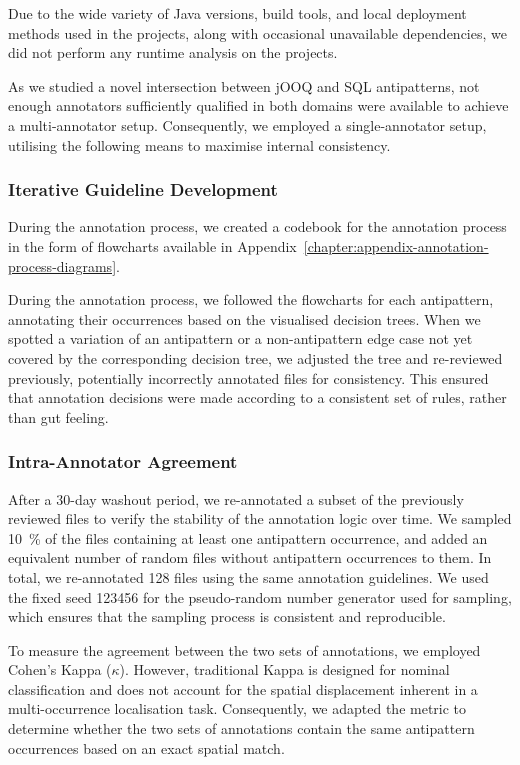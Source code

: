 Due to the wide variety of Java versions, build tools, and local deployment methods used in the projects, along with occasional unavailable dependencies, we did not perform any runtime analysis on the projects.

As we studied a novel intersection between jOOQ and SQL antipatterns, not enough annotators sufficiently qualified in both domains were available to achieve a multi-annotator setup. Consequently, we employed a single-annotator setup, utilising the following means to maximise internal consistency.

\subsubsection*{Iterative Guideline Development}

During the annotation process, we created a codebook for the annotation process in the form of flowcharts available in Appendix~\ref{chapter:appendix-annotation-process-diagrams}.

During the annotation process, we followed the flowcharts for each antipattern, annotating their occurrences based on the visualised decision trees. When we spotted a variation of an antipattern or a non-antipattern edge case not yet covered by the corresponding decision tree, we adjusted the tree and re-reviewed previously, potentially incorrectly annotated files for consistency. This ensured that annotation decisions were made according to a consistent set of rules, rather than gut feeling.

\subsubsection*{Intra-Annotator Agreement}

After a 30-day washout period, we re-annotated a subset of the previously reviewed files to verify the stability of the annotation logic over time. We sampled \qty{10}{\percent} of the files containing at least one antipattern occurrence, and added an equivalent number of random files without antipattern occurrences to them. In total, we re-annotated \num{128} files using the same annotation guidelines. We used the fixed seed \num{123456} for the pseudo-random number generator used for sampling, which ensures that the sampling process is consistent and reproducible.

To measure the agreement between the two sets of annotations, we employed Cohen's Kappa ($\kappa$). However, traditional Kappa is designed for nominal classification and does not account for the spatial displacement inherent in a multi-occurrence localisation task. Consequently, we adapted the metric to determine whether the two sets of annotations contain the same antipattern occurrences based on an exact spatial match.


